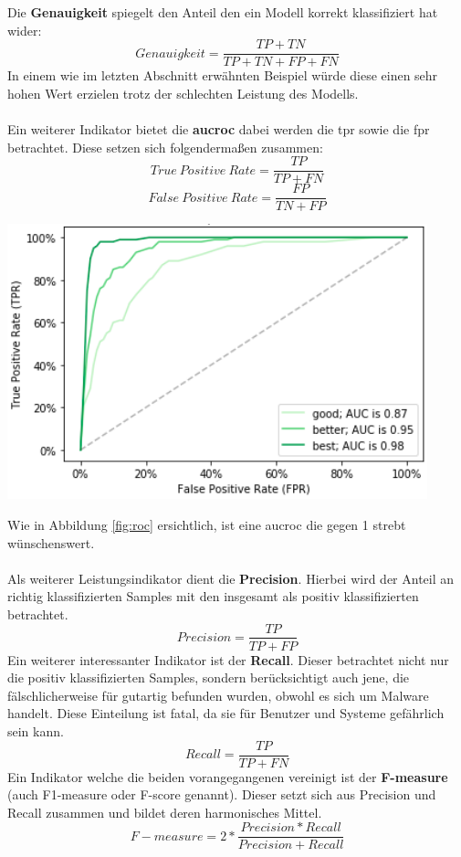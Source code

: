 \documentclass[
    12pt, %
    DIV10,
    ngerman, %
    a4paper, %
    oneside, %
    titlepage, %
    parskip=half, %
    headings=normal, %
    listof=totoc, %
    bibliography=totoc, %
    index=totoc, %
    captions=tableheading, %
    final %
]{scrreprt}
\begin{document}
Die \textbf{Genauigkeit} spiegelt den Anteil den ein Modell korrekt klassifiziert hat wider:
$$Genauigkeit = \frac{TP + TN}{TP + TN + FP + FN}$$ In einem wie im letzten Abschnitt erwähnten Beispiel würde diese einen sehr hohen Wert erzielen trotz der schlechten Leistung des Modells.
\\\\
Ein weiterer Indikator bietet die \textbf{\ac{aucroc}} dabei werden die \ac{tpr} sowie die \ac{fpr} betrachtet. Diese setzen sich folgenderma{\ss}en zusammen:
$$True\ Positive\ Rate = \frac{TP}{TP + FN}$$
$$False\ Positive\ Rate = \frac{FP}{TN + FP}$$
\begin{center}
\includegraphics[scale=0.6]{img/roc.png}
\label{fig:roc}
\end{center}
Wie in Abbildung \ref{fig:roc} ersichtlich, ist eine \ac{aucroc} die gegen 1 strebt wünschenswert.
\\\\
Als weiterer Leistungsindikator dient die \textbf{Precision}. Hierbei wird der Anteil an richtig klassifizierten Samples mit den insgesamt als positiv klassifizierten betrachtet.
$$Precision = \frac{TP}{TP + FP}$$
Ein weiterer interessanter Indikator ist der \textbf{Recall}. Dieser betrachtet nicht nur die positiv klassifizierten Samples, sondern berücksichtigt auch jene, die fälschlicherweise für gutartig befunden wurden, obwohl es sich um Malware handelt. Diese Einteilung ist fatal, da sie für Benutzer und Systeme gefährlich sein kann.
$$Recall = \frac{TP}{TP + FN}$$
Ein Indikator welche die beiden vorangegangenen vereinigt ist der \textbf{F-measure} (auch F1-measure oder F-score genannt).
Dieser setzt sich aus Precision und Recall zusammen und bildet deren harmonisches Mittel.
$$F-measure = 2*\frac{Precision * Recall}{Precision + Recall}$$
\end{document}
